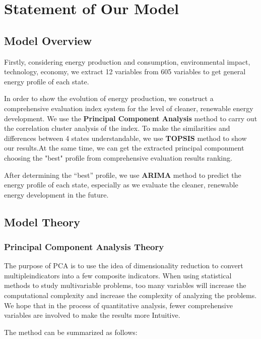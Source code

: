 \documentclass{mcmthesis}
\begin{document}
\section{Statement of Our Model}
    \subsection{Model Overview}
    Firstly, considering energy production and consumption, environmental impact, technology, economy, we extract 12 variables from 605 variables to get general energy profile of each state.

    In order to show the evolution of energy production, we construct a comprehensive evaluation index system for the level of cleaner, renewable energy development. We use the \textbf{Principal Component Analysis} method to carry out the correlation cluster analysis of the index. To make the similarities and differences between 4 states understandable, we use \textbf{TOPSIS} method to show our results.At the same time, we can get the extracted principal componment choosing the "best" profile from comprehensive evaluation results ranking.

    After determining the “best” profile, we use \textbf{ARIMA} method to predict the energy profile of each state, especially as we evaluate the cleaner, renewable energy development in the future.

    \subsection{Model Theory}
        \subsubsection{Principal Component Analysis Theory}
        The purpose of PCA is to use the idea of dimensionality reduction to convert multipleindicators into a few composite indicators. When using statistical methods to study multivariable problems, too many variables will increase the computational complexity and increase the complexity of analyzing the problems. We hope that in the process of quantitative analysis, fewer comprehensive variables are involved to make the results more Intuitive.

        The method can be summarized as follows:
\end{document}
